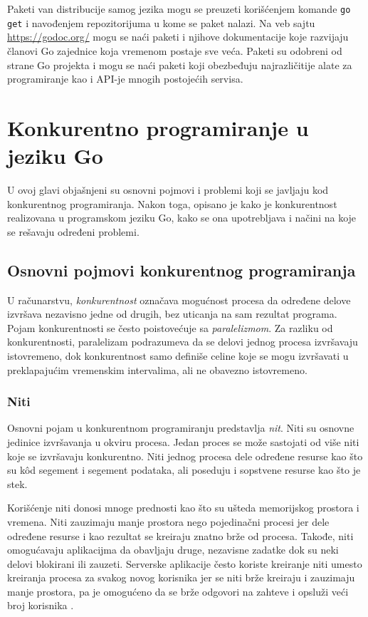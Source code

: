 \documentclass[12pt,oneside]{memoir}
\begin{document}
Paketi van distribucije samog jezika mogu se preuzeti korišćenjem komande \texttt{go get} i navođenjem repozitorijuma u kome se paket nalazi. Na veb sajtu \url{https://godoc.org/} mogu se naći paketi i njihove dokumentacije koje razvijaju članovi Go zajednice koja vremenom postaje sve veća. Paketi su odobreni od strane Go projekta i mogu se naći paketi koji obezbeđuju najrazličitije alate za programiranje kao i API-je mnogih postojećih servisa.


\chapter{Konkurentno programiranje u jeziku Go} \label{conc}

U ovoj glavi objašnjeni su osnovni pojmovi i problemi koji se javljaju kod konkurentnog programiranja. Nakon toga, opisano je kako je konkurentnost realizovana u programskom jeziku Go, kako se ona upotrebljava i načini na koje se rešavaju određeni problemi. 

\section{Osnovni pojmovi konkurentnog programiranja}

U računarstvu, \textit{konkurentnost} označava mogućnost procesa da određene delove izvršava nezavisno jedne od drugih, bez uticanja na sam rezultat programa. Pojam konkurentnosti se često poistovećuje sa \textit{paralelizmom}. Za razliku od konkurentnosti, paralelizam podrazumeva da se delovi jednog procesa izvršavaju istovremeno, dok konkurentnost samo definiše celine koje se mogu izvršavati u preklapajućim vremenskim intervalima, ali ne obavezno istovremeno. 

\subsection{Niti}

Osnovni pojam u konkurentnom programiranju predstavlja \textit{nit}. Niti su osnovne jedinice izvršavanja u okviru procesa. Jedan proces se može sastojati od više niti koje se izvršavaju konkurentno. Niti jednog procesa dele određene resurse kao što su k\^{o}d segement i segement podataka, ali poseduju i sopstvene resurse kao što je stek. 

Korišćenje niti donosi mnoge prednosti kao što su ušteda memorijskog prostora i vremena. Niti zauzimaju manje prostora nego pojedinačni procesi jer dele određene resurse i kao rezultat se kreiraju znatno brže od procesa. Takođe, niti omogućavaju aplikacijma da obavljaju druge, nezavisne zadatke dok su neki delovi blokirani ili zauzeti. Serverske aplikacije često koriste kreiranje niti umesto kreiranja procesa za svakog novog korisnika jer se niti brže kreiraju i zauzimaju manje prostora, pa je omogućeno da se brže odgovori na zahteve i opsluži veći broj korisnika \cite{os}.  
\end{document}
